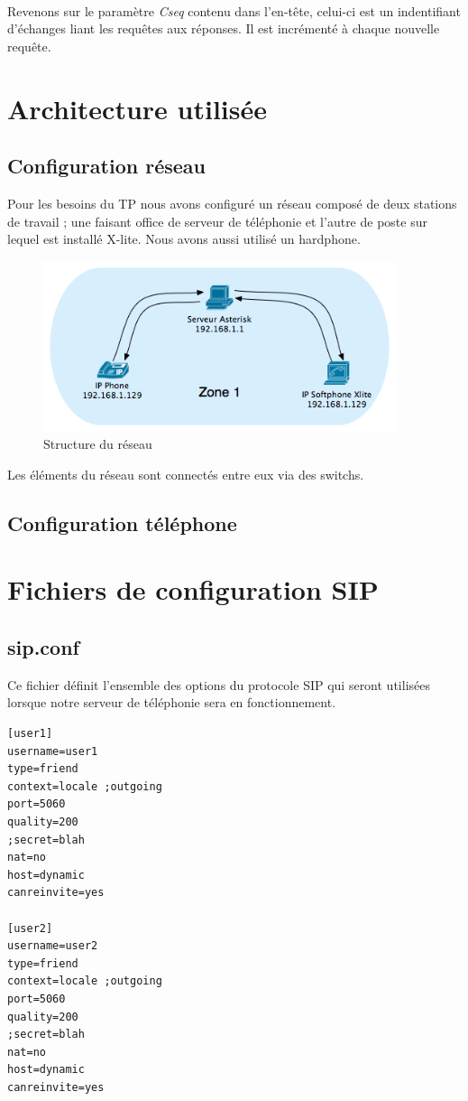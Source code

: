 \documentclass[12pt,a4paper,notitlepage]{article}
\begin{document}
\paragraph{} Revenons sur le paramètre \textit{Cseq} contenu dans l'en-tête, celui-ci est un indentifiant d'échanges liant les requêtes aux réponses. Il est incrémenté à chaque nouvelle requête.

\section{Architecture utilisée}
\subsection{Configuration réseau}
Pour les besoins du TP nous avons configuré un réseau composé de deux stations de travail ; une faisant office de serveur de téléphonie et l'autre de poste sur lequel est installé X-lite. Nous avons aussi utilisé un hardphone.

\begin{figure}[!h]
\begin{center}
\includegraphics[height=5cm]{structure_reseau}
\caption{Structure du réseau}
\label{fig:da}
\end{center}
\end{figure}


Les éléments du réseau sont connectés entre eux via des switchs.
\subsection{Configuration téléphone}
\clearpage
\section{Fichiers de configuration SIP}
\subsection{sip.conf}
Ce fichier définit l'ensemble des options du protocole SIP qui seront utilisées lorsque notre serveur de téléphonie sera en fonctionnement. \\
\begin{lstlisting}[title=sip.conf v1]
[user1]
username=user1
type=friend
context=locale ;outgoing
port=5060
quality=200
;secret=blah
nat=no
host=dynamic
canreinvite=yes

[user2]
username=user2
type=friend
context=locale ;outgoing
port=5060
quality=200
;secret=blah
nat=no
host=dynamic
canreinvite=yes
\end{lstlisting}
\end{document}
